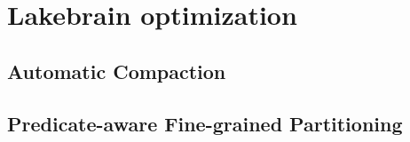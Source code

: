 \section{Lakebrain optimization} 
\label{sec:dataeva}


\subsection{Automatic Compaction}


\subsection{Predicate-aware Fine-grained Partitioning}
